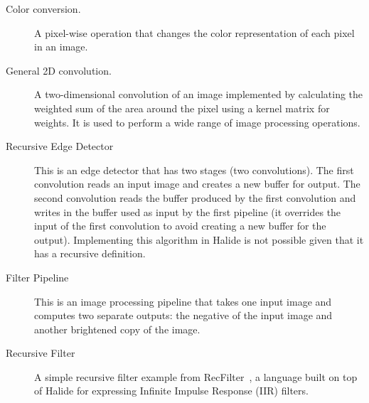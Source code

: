 \begin{description}
\item[Color conversion.] A pixel-wise operation that changes the color representation of each pixel in an image.
 
\item[General 2D convolution.] A two-dimensional convolution of an image implemented by calculating the weighted sum of the area around the pixel using a kernel matrix for weights.  It is used to perform a wide range of image processing operations.



\item[Recursive Edge Detector] This is an edge detector that has two stages (two convolutions).  The first convolution reads an input image and creates a new buffer for output.  The second convolution reads the buffer produced by the first convolution and writes in the buffer used as input by the first pipeline (it overrides the input of the first convolution to avoid creating a new buffer for the output).  Implementing this algorithm in Halide is not possible given that it has a recursive definition.

\item[Filter Pipeline] This is an image processing pipeline that takes one input image and computes two separate outputs: the negative of the input image and another brightened copy of the image.%

\item[Recursive Filter] A simple recursive filter example from RecFilter~\cite{recfilter}, a language built on top of Halide for expressing Infinite Impulse Response (IIR) filters.
\end{description}

